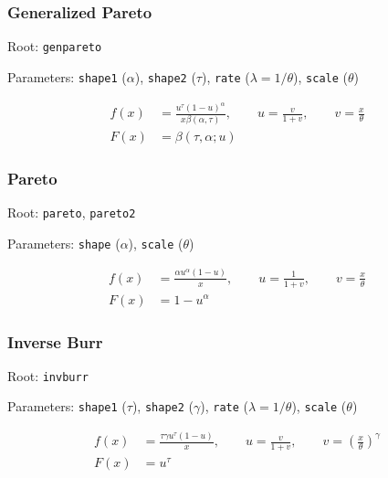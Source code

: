 \documentclass[x11names]{article}
\newcommand{\code}[1]{\texttt{#1}}
\begin{document}
\subsubsection*{Generalized Pareto}

\begin{compactitem}[]
\item Root: \code{genpareto}
\item Parameters: \code{shape1} ($\alpha$),
      \code{shape2} ($\tau$),
      \code{rate}   ($\lambda = 1/\theta$),
      \code{scale}  ($\theta$)
\end{compactitem}

\begin{align*}
  f(x) &= \frac{u^\tau (1 - u)^\alpha}{x \beta (\alpha, \tau )},
  \qquad u = \frac{v}{1 + v},
  \qquad v = \frac{x}{\theta} \\
  F(x) &= \beta (\tau, \alpha ; u)
\end{align*}

\subsubsection*{Pareto}

\begin{compactitem}[]
\item Root: \code{pareto}, \code{pareto2}
\item Parameters: \code{shape} ($\alpha$),
      \code{scale}  ($\theta$)
\end{compactitem}

\begin{align*}
  f(x) &= \frac{\alpha u^\alpha (1 - u)}{x},
  \qquad u = \frac{1}{1 + v},
  \qquad v = \frac{x}{\theta} \\
  F(x) &= 1 - u^\alpha
\end{align*}

\subsubsection*{Inverse Burr}

\begin{compactitem}[]
\item Root: \code{invburr}
\item Parameters: \code{shape1} ($\tau$),
      \code{shape2} ($\gamma$),
      \code{rate}   ($\lambda = 1/\theta$),
      \code{scale}  ($\theta$)
\end{compactitem}

\begin{align*}
  f(x) &= \frac{\tau \gamma u^\tau (1 - u)}{x},
  \qquad u = \frac{v}{1 + v},
  \qquad v = \left( \frac{x}{\theta} \right)^\gamma \\
  F(x) &= u^\tau
\end{align*}
\end{document}
